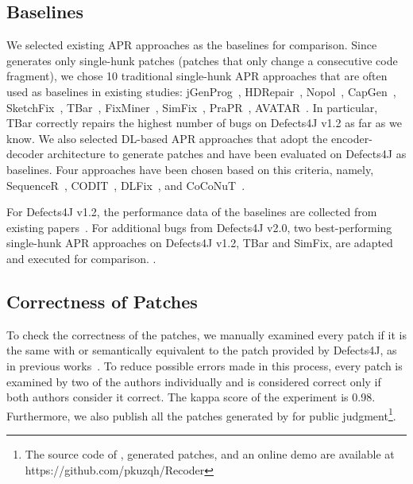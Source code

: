 \subsection{Baselines}
We selected existing APR approaches as the baselines for comparison. Since \techname generates only single-hunk patches (patches that only change a consecutive code fragment), we chose 10 traditional single-hunk APR approaches that are often used as baselines in existing studies: {jGenProg}~\cite{genprog}, {HDRepair}~\cite{le2016history}, {Nopol}~\cite{xuan2016nopol}, {CapGen}~\cite{capgen}, {SketchFix}~\cite{hua2018sketchfix}, {TBar}~\cite{liu2019tbar},
{FixMiner}~\cite{koyuncu2020fixminer}, {SimFix}~\cite{2018Shaping}, {PraPR}~\cite{prapr}, {AVATAR}~\cite{liu2019avatar}. In particular, TBar correctly repairs the highest number of bugs on Defects4J v1.2 as far as we know. We also selected DL-based APR approaches that adopt the encoder-decoder architecture to generate patches and have been evaluated on Defects4J as baselines. Four approaches have been chosen based on this criteria, namely, {SequenceR}~\cite{9000077}, {CODIT}~\cite{codit}, {DLFix}~\cite{dlfix}, and {CoCoNuT}~\cite{coconut}. 

For Defects4J v1.2, the performance data of the baselines are collected from existing papers~\cite{liu2019tbar, liu2020efficiency}.
For additional bugs from Defects4J v2.0, two best-performing single-hunk APR approaches on Defects4J v1.2, TBar and SimFix, are adapted and executed for comparison. .

\subsection{Correctness of Patches}
To check the correctness of the patches, we manually examined every patch if it is the same with or semantically equivalent to the patch provided by Defects4J, as in previous works~\cite{liu2019tbar, 2018Shaping, dlfix, coconut, prapr}. To reduce possible errors made in this process, every patch is examined by two of the authors individually and is considered correct only if both authors consider it correct. The kappa score of the experiment is 0.98.
Furthermore, we also publish all the patches generated by \techname for public judgment\footnote{The source code of \techname, generated patches, and an online demo are available at https://github.com/pkuzqh/Recoder}.

